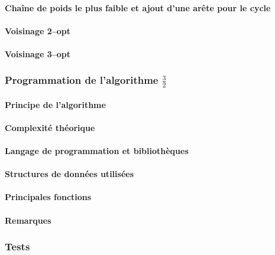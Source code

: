 \documentclass[a4paper, 12pt]{article}
\begin{document}
\paragraph{Chaîne de poids le plus faible et ajout d'une arête pour le
  cycle}


\paragraph{Voisinage 2--opt}

\paragraph{Voisinage 3--opt}

\subsubsection{Programmation de l'algorithme $\frac{3}{2}$}

\paragraph{Principe de l'algorithme}

\paragraph{Complexité théorique}

\paragraph{Langage de programmation et bibliothèques}

\paragraph{Structures de données utilisées}

\paragraph{Principales fonctions}

\paragraph{Remarques}

\subsubsection{Tests}
\end{document}
